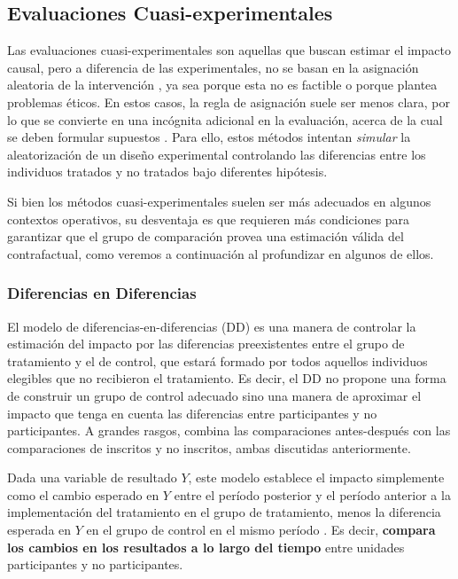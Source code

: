 \documentclass[../../main.tex]{subfiles}
\begin{document}
\subsection{Evaluaciones Cuasi-experimentales}
Las evaluaciones cuasi-experimentales son aquellas que buscan estimar el impacto causal, pero a diferencia de las experimentales, no se basan en la asignación aleatoria de la intervención \cite{gertler-2016}, ya sea porque esta no es factible o porque plantea problemas éticos. En estos casos, la regla de asignación suele ser menos clara, por lo que se convierte en una incógnita adicional en la evaluación, acerca de la cual se deben formular supuestos \cite{gertler-2016}. Para ello, estos métodos intentan \textit{simular} la aleatorización de un diseño experimental controlando las diferencias entre los individuos tratados y no tratados bajo diferentes hipótesis.

Si bien los métodos cuasi-experimentales suelen ser más adecuados en algunos contextos operativos, su desventaja es que requieren más condiciones para garantizar que el grupo de comparación provea una estimación válida del contrafactual, como veremos a continuación al profundizar en algunos de ellos.

\subsubsection{Diferencias en Diferencias}
El modelo de diferencias-en-diferencias (DD) es una manera de controlar la estimación del impacto por las diferencias preexistentes entre el grupo de tratamiento y el de control, que estará formado por todos aquellos individuos elegibles que no recibieron el tratamiento. Es decir, el DD no propone una forma de construir un grupo de control adecuado sino una manera de aproximar el impacto que tenga en cuenta las diferencias entre participantes y no participantes. A grandes rasgos, combina las comparaciones antes-después con las comparaciones de inscritos y no inscritos, ambas discutidas anteriormente. 

Dada una variable de resultado \(Y\), este modelo establece el impacto simplemente como el cambio esperado en \(Y\) entre el período posterior y el período anterior a la implementación del tratamiento en el grupo de tratamiento, menos la diferencia esperada en \(Y\) en el grupo de control en el mismo período \cite{bernal}. Es decir, \textbf{compara los cambios en los resultados a lo largo del tiempo} entre unidades participantes y no participantes. 
\end{document}
